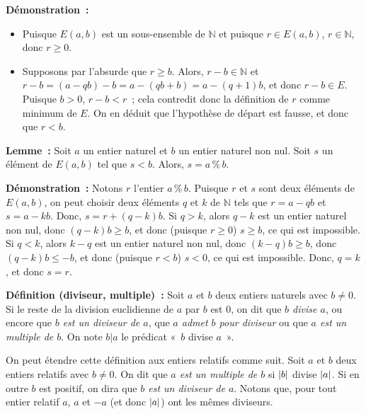 \medskip

\noindent\textbf{Démonstration :} 
\begin{itemize}[nosep]
    \item Puisque $E(a,b)$ est un sous-ensemble de $\mathbb{N}$ et puisque $r \in E(a,b)$, $r \in \mathbb{N}$, donc $r \geq 0$.
    \item Supposons par l'absurde que $r \geq b$. 
        Alors, $r - b \in \mathbb{N}$ et $r - b = (a - q b) - b = a - (q b + b) = a - (q+1) b$, et donc $r - b \in E$. 
        Puisque $b > 0$, $r - b < r$ ; cela contredit donc la définition de $r$ comme minimum de $E$. 
        On en déduit que l'hypothèse de départ est fausse, et donc que $r < b$.
\end{itemize}

\done

\medskip

\noindent\textbf{Lemme :} Soit $a$ un entier naturel et $b$ un entier naturel non nul.
    Soit $s$ un élément de $E(a,b)$ tel que $s < b$.
    Alors, $s = a \mathrel{\%} b$.

\medskip

\noindent\textbf{Démonstration :} 
    Notons $r$ l'entier $a \mathrel{\%} b$.
    Puisque $r$ et $s$ sont deux éléments de $E(a,b)$, on peut choisir deux éléments $q$ et $k$ de $\mathbb{N}$ tels que $r = a - q b$ et $s = a - k b$. 
    Donc, $s = r + (q-k) b$. 
    Si $q > k$, alors $q-k$ est un entier naturel non nul, donc $(q-k) b \geq b$, et donc (puisque $r \geq 0$) $s \geq b$, ce qui est impossible.
    Si $q < k$, alors $k-q$ est un entier naturel non nul, donc $(k-q) b \geq b$, donc $(q-k) b \leq -b$, et donc (puisque $r < b$) $s < 0$, ce qui est impossible. 
    Donc, $q = k$, et donc $s = r$.

    \done

\medskip

\noindent\textbf{Définition (diviseur, multiple) :} 
    Soit $a$ et $b$ deux entiers naturels avec $b \neq 0$.
    Si le reste de la division euclidienne de $a$ par $b$ est $0$, on dit que \textit{$b$ divise $a$}, ou encore que \textit{$b$ est un diviseur de $a$}, que \textit{$a$ admet $b$ pour diviseur} ou que \textit{$a$ est un multiple de $b$}. 
    On note $b \vert a$ le prédicat « $b$ divise $a$ ».

On peut étendre cette définition aux entiers relatifs comme suit. 
Soit $a$ et $b$ deux entiers relatifs avec $b \neq 0$.
On dit que \emph{$a$ est un multiple de $b$} si $\left\lvert b \right\rvert$ divise $\left\lvert a \right\rvert$.
Si en outre $b$ est positif, on dira que \emph{$b$ est un diviseur de $a$}.
Notons que, pour tout entier relatif $a$, $a$ et $-a$ (et donc $\left\lvert a \right\rvert$) ont les mêmes diviseurs.

